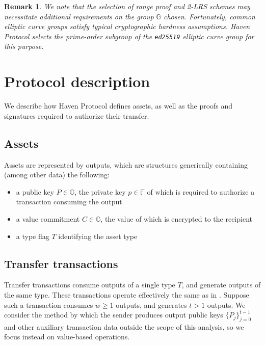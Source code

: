 \documentclass{article}
\newtheorem*{remark}{Remark}
\newcommand{\G}{\mathbb{G}}
\newcommand{\F}{\mathbb{F}}
\begin{document}
\begin{remark}
We note that the selection of range proof and 2-LRS schemes may necessitate additional requirements on the group $\G$ chosen.
Fortunately, common elliptic curve groups satisfy typical cryptographic hardness assumptions.
Haven Protocol selects the prime-order subgroup of the \texttt{ed25519} elliptic curve group for this purpose.
\end{remark}


\section{Protocol description}

We describe how Haven Protocol defines assets, as well as the proofs and signatures required to authorize their transfer.


\subsection{Assets}

Assets are represented by outputs, which are structures generically containing (among other data) the following:
\begin{itemize}
    \item a public key $P \in \G$, the private key $p \in \F$ of which is required to authorize a transaction consuming the output
    \item a value commitment $C \in \G$, the value of which is encrypted to the recipient
    \item a type flag $T$ identifying the asset type
\end{itemize}


\subsection{Transfer transactions}

Transfer transactions consume outputs of a single type $T$, and generate outputs of the same type.
These transactions operate effectively the same as in \cite{ringct}.
Suppose such a transaction consumes $w \geq 1$ outputs, and generates $t > 1$ outputs.
We consider the method by which the sender produces output public keys $\{P_j\}_{j=0}^{t-1}$ and other auxiliary transaction data outside the scope of this analysis, so we focus instead on value-based operations.
\end{document}
